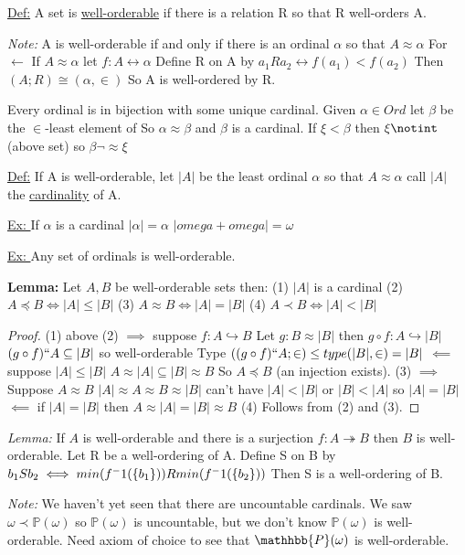 \underline{Def:} A set is \underline{well-orderable} if there is a relation R so that R well-orders A.

\emph{Note:} A is well-orderable if and only if there is an ordinal $\alpha$ so that $A \approx \alpha$
For $\leftarrow$ If $A \approx \alpha$ let $f : A \leftrightarrow \alpha$
Define R on A by $a_1 R a_2 \leftrightarrow f(a_1) < f(a_2)$
Then $(A;R) \cong (\alpha, \in)$
So A is well-ordered by R.

 Every ordinal is in bijection with some unique cardinal.
Given $\alpha \in Ord$ let $\beta$ be the $\in$-least element of
\set{\xi \leq \alpha : \alpha \approx \xi}
So $\alpha \approx \beta$ and $\beta$ is a cardinal.
If $\xi < \beta$ then $\xi \notint$ (above set) so $\beta \neg \approx \xi$

\underline{Def:} If A is well-orderable, let $|A|$ be the least ordinal $\alpha$ so that $A \approx \alpha$ call $|A|$ the \underline{cardinality} of A.

\underline{Ex: } If $\alpha$ is a cardinal $|\alpha| = \alpha$
$|omega + omega| = \omega$

\underline{Ex: } Any set of ordinals is well-orderable.

\textbf{Lemma: } Let $A,B$ be well-orderable sets then:
(1) $|A|$ is a cardinal
(2) $A \preceq B \iff |A| \leq |B|$
(3) $A \approx B \iff |A| = |B|$
(4) $A \prec B \iff |A| < |B|$

\begin{proof}
(1) above
(2) $\implies$ suppose $f : A \hookrightarrow B$
    Let $g : B \approx |B|$
    then $g \circ f : A \hookrightarrow |B|$
    $(g \circ f)`` A \subseteq |B|$
    so well-orderable
    Type $((g \circ f)``A;\in) \leq type(|B|,\in) = |B|$
    $\impliedby$ suppose $|A| \leq |B|$
    $A \approx |A| \subseteq |B| \approx B$
    So $A \preceq B$ (an injection exists).
(3) $\implies$ Suppose $A \approx B$
    $|A| \approx A \approx B \approx |B|$
    can't have $|A| < |B|$ or $|B| < |A|$
    so $|A| = |B|$
    $\impliedby$ if $|A| = |B|$ then $A \approx |A| = |B| \approx B$
(4) Follows from (2) and (3).
\end{proof}

\emph{Lemma:} If $A$ is well-orderable and there is a surjection $f: A \twoheadrightarrow B$ then $B$ is well-orderable.
 Let R be a well-ordering of A.
Define S on B by $b_1 S b_2 \iff min(f^-1(\{b_1\})) R min(f^-1(\{b_2\}))$
Then S is a well-ordering of B.

\emph{Note:} We haven't yet seen that there are uncountable cardinals.
We saw $\omega \prec \mathbb{P}(\omega)$ so $\mathbb{P}(\omega)$ is uncountable, but we don't know $\mathbb{P}(\omega)$ is well-orderable.
Need axiom of choice to see that $\mathhbb{P}(\omega)$ is well-orderable.

